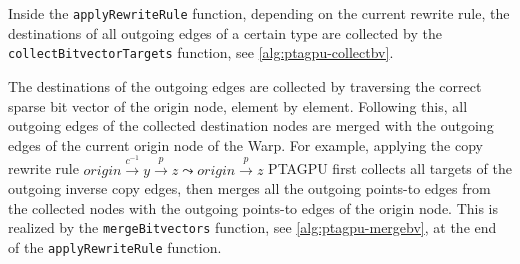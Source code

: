 Inside the \verb|applyRewriteRule| function, depending on the current rewrite rule, the destinations of all outgoing edges of a certain type are collected by the \verb|collectBitvectorTargets| function, see \autoref{alg:ptagpu-collectbv}.
The destinations of the outgoing edges are collected by traversing the correct sparse bit vector of the origin node, element by element.
Following this, all outgoing edges of the collected destination nodes are merged with the outgoing edges of the current origin node of the Warp.
For example, applying the copy rewrite rule $origin \xrightarrow{c^{-1}} y \xrightarrow{p} z \mathrel{\leadsto} origin \xrightarrow{p} z$ PTAGPU first collects all targets of the outgoing inverse copy edges, then merges all the outgoing points-to edges from the collected nodes with the outgoing points-to edges of the origin node.
This is realized by the \verb|mergeBitvectors| function, see \autoref{alg:ptagpu-mergebv}, at the end of the \verb|applyRewriteRule| function.
